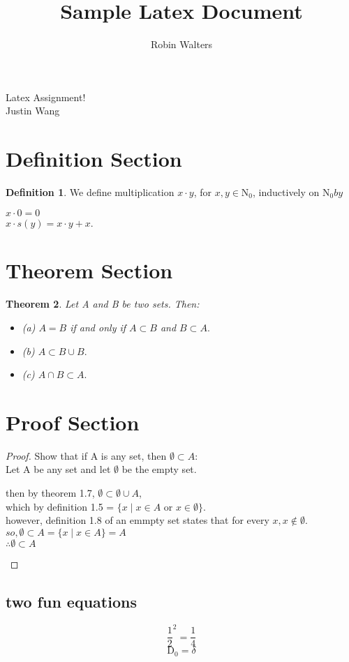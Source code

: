 \documentclass[12pt]{article}
\title{Sample Latex Document}
\author{Robin Walters}
\newtheorem{theorem}{Theorem}[section]
\theoremstyle{definition}
\newtheorem{definition}[theorem]{Definition}
\numberwithin{equation}{subsection}
\begin{document}
\pagestyle{plain}



\begin{center}
{\large Latex Assignment!} \\ 
\vspace{.2in}  
Justin Wang
\end{center}

\bigskip \bigskip

\section{Definition Section}
\begin{definition}
We define multiplication $x \cdot y$, for $x,y \in \text{N}_0$, inductively on $\text{N}_0 by$
\begin{center}
$ x \cdot 0 =0$ \\
$x \cdot s(y) = x \cdot y + x$.
\end{center}
\end{definition}

\section{Theorem Section}
\begin{theorem}{}{}
\textit{Let A and B be two sets. Then:}
\begin{itemize}
\item (a) $A = B$ \textit{if and only if} $A \subset B$ \textit{and} $B \subset A.$
\item (b) $A \subset B \cup B.$
\item (c) $A \cap B \subset A.$ 
\end{itemize}
\end{theorem}

\section{Proof Section}
\begin{proof}
Show that if A is any set, then $\emptyset \subset A$: \\
Let A be any set and let $\emptyset$ be the empty set.
\begin{center} 
    then by theorem 1.7, $\emptyset \subset \emptyset \cup A$, \\
    which by definition 1.5 = $\{x \mid x \in A $ or $ x \in \emptyset \}$. \\
    however, definition 1.8 of an emmpty set states that for every $x, x\notin \emptyset$. \\
    $so,  \emptyset \subset A = \{x \mid x \in A \} = A$ \\
    $\therefore \emptyset \subset A$
\end{center}
\end{proof}
\subsection{two fun equations}
\begin{equation}
\frac{1}{2}^2 = \frac{1}{4} 
\end{equation}
\begin{equation}
\text{D}_0 = \delta
\end{equation}
\end{document}

